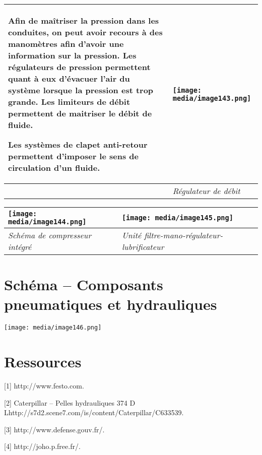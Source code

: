 \documentclass[
]{article}
\begin{document}
\begin{longtable}[]{@{}
  >{\raggedright\arraybackslash}p{}
  >{\raggedright\arraybackslash}p{}@{}}
\toprule
Afin de maîtriser la pression dans les conduites, on peut avoir recours
à des manomètres afin d'avoir une information sur la pression. Les
régulateurs de pression permettent quant à eux d'évacuer l'air du
système lorsque la pression est trop grande. Les limiteurs de débit
permettent de maitriser le débit de fluide.

Les systèmes de clapet anti-retour permettent d'imposer le sens de
circulation d'un fluide. &
\texttt{[image: media/image143.png]} \\
\midrule
\endhead
& \emph{Régulateur de débit} \\
\bottomrule
\end{longtable}

\begin{longtable}[]{@{}ll@{}}
\toprule
\texttt{[image: media/image144.png]} &
\texttt{[image: media/image145.png]} \\
\midrule
\endhead
\emph{Schéma de compresseur intégré} & \emph{Unité
filtre-mano-régulateur-lubrificateur} \\
\bottomrule
\end{longtable}

\hypertarget{schuxe9ma-composants-pneumatiques-et-hydrauliques}{%
\section{Schéma -- Composants pneumatiques et
hydrauliques}\label{schuxe9ma-composants-pneumatiques-et-hydrauliques}}

\texttt{[image: media/image146.png]}

\hypertarget{ressources}{%
\section{Ressources}\label{ressources}}

{[}1{]} http://www.festo.com.

{[}2{]} Caterpillar -- Pelles hydrauliques 374 D
Lhttp://s7d2.scene7.com/is/content/Caterpillar/C633539.

{[}3{]} http://www.defense.gouv.fr/.

{[}4{]} http://joho.p.free.fr/.
\end{document}
